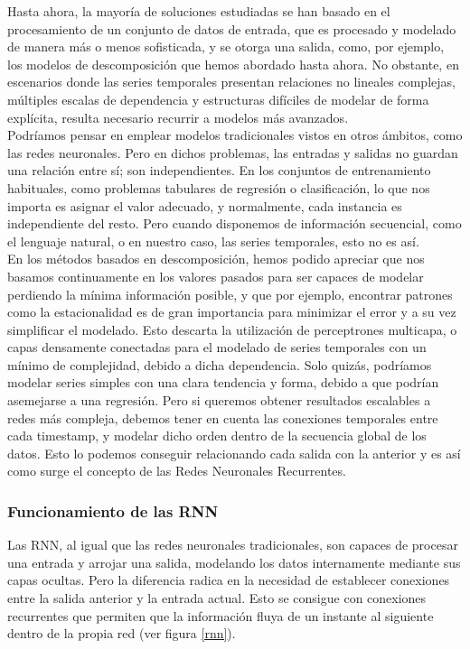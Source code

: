 Hasta ahora, la mayoría de soluciones estudiadas se han basado en el procesamiento de un conjunto de datos de entrada, que es procesado y modelado de manera más o menos sofisticada, y se otorga una salida, como, por ejemplo, los modelos de descomposición que hemos abordado hasta ahora. No obstante, en escenarios donde las series temporales presentan relaciones no lineales complejas, múltiples escalas de dependencia y estructuras difíciles de modelar de forma explícita, resulta necesario recurrir a modelos más avanzados.\\

Podríamos pensar en emplear modelos tradicionales vistos en otros ámbitos, como las redes neuronales. Pero en dichos problemas, las entradas y salidas no guardan una relación entre sí; son independientes. En los conjuntos de entrenamiento habituales, como problemas tabulares de regresión o clasificación, lo que nos importa es asignar el valor adecuado, y normalmente, cada instancia es independiente del resto. Pero cuando disponemos de información secuencial, como el lenguaje natural, o en nuestro caso, las series temporales, esto no es así.\\

 En los métodos basados en descomposición, hemos podido apreciar que nos basamos continuamente en los valores pasados para ser capaces de modelar perdiendo la mínima información posible, y que por ejemplo, encontrar patrones como la estacionalidad es de gran importancia para minimizar el error y a su vez simplificar el modelado. Esto descarta la utilización de perceptrones multicapa, o capas densamente conectadas para el modelado de series temporales con un mínimo de complejidad, debido a dicha dependencia. Solo quizás, podríamos modelar series simples con una clara tendencia y forma, debido a que podrían asemejarse a una regresión. Pero si queremos obtener resultados escalables a redes más compleja, debemos tener en cuenta las conexiones temporales entre cada timestamp, y modelar dicho orden dentro de la secuencia global de los datos. Esto lo podemos conseguir relacionando cada salida con la anterior y es así como surge el concepto de las Redes Neuronales Recurrentes.
 
 \subsubsection{Funcionamiento de las RNN}
 
 Las RNN, al igual que las redes neuronales tradicionales, son capaces de procesar una entrada y arrojar una salida, modelando los datos internamente mediante sus capas ocultas. Pero la diferencia radica en la necesidad de establecer conexiones entre la salida anterior y la entrada actual. Esto se consigue con conexiones recurrentes que permiten que la información fluya de un instante al siguiente dentro de la propia red (ver figura \ref{rnn}).
 
